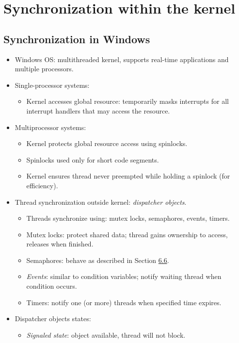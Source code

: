 \section{Synchronization within the kernel}

\subsection{Synchronization in Windows}
\begin{itemize}
    \item Windows OS: multithreaded kernel, supports real-time applications and multiple processors.
    \item Single-processor systems:
    \begin{itemize}
        \item Kernel accesses global resource: temporarily masks interrupts for all interrupt handlers that may access the resource.
    \end{itemize}
    \item Multiprocessor systems:
    \begin{itemize}
        \item Kernel protects global resource access using spinlocks.
        \item Spinlocks used only for short code segments.
        \item Kernel ensures thread never preempted while holding a spinlock (for efficiency).
    \end{itemize}
    \item Thread synchronization outside kernel: \textit{dispatcher objects}.
    \begin{itemize}
        \item Threads synchronize using: mutex locks, semaphores, events, timers.
        \item Mutex locks: protect shared data; thread gains ownership to access, releases when finished.
        \item Semaphores: behave as described in Section \hyperref[sec:6.6]{6.6}.
        \item \textit{Events}: similar to condition variables; notify waiting thread when condition occurs.
        \item Timers: notify one (or more) threads when specified time expires.
    \end{itemize}
    \item Dispatcher objects states:
    \begin{itemize}
        \item \textit{Signaled state}: object available, thread will not block.

\end{itemize}
\end{itemize}

